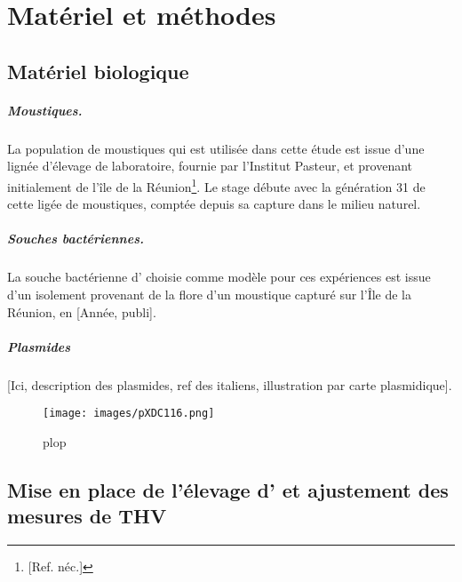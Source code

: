 \chapter{Matériel et méthodes}

\section{Matériel biologique}

\paragraph{Moustiques.}
\label{par:moustiques}
La population de moustiques  qui est utilisée dans cette étude est issue d'une lignée d'élevage de laboratoire, fournie par l'Institut Pasteur, et provenant initialement de l'île de la Réunion\footnote{[Ref. néc.]}.
Le stage débute avec la génération 31 de cette ligée de moustiques, comptée depuis sa capture dans le milieu naturel.

\paragraph{Souches bactériennes.}
La souche bactérienne d' choisie comme modèle pour ces expériences est issue d'un isolement provenant de la flore d'un moustique capturé sur l'Île de la Réunion, en [Année, publi]\cite{zouache2011}.

\paragraph{Plasmides}
[Ici, description des plasmides, ref des italiens, illustration par carte plasmidique].

\begin{figure}[h]
   \texttt{[image: images/pXDC116.png]}
   \caption{plop}
\end{figure}

\section{Mise en place de l'élevage d' et ajustement des mesures de THV}

